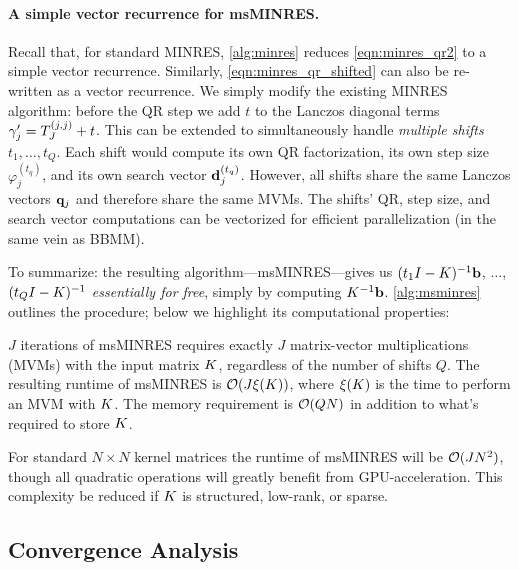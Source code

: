 

\paragraph{A simple vector recurrence for msMINRES.}
Recall that, for standard MINRES, \cref{alg:minres} reduces \cref{eqn:minres_qr2} to a simple vector recurrence.
Similarly, \cref{eqn:minres_qr_shifted} can also be re-written as a vector recurrence.
We simply modify the existing MINRES algorithm: before the QR step we add $t$ to the Lanczos diagonal terms $\gamma_j' = T_J^{(j,j)} + t$.
This can be extended to simultaneously handle \emph{multiple shifts} $t_1, \ldots, t_Q$.
Each shift would compute its own QR factorization, its own step size $\varphi_j^{(t_q)}$, and its own search vector $\mathbf{d}_j^{(t_q)}$.
However, all shifts share the same Lanczos vectors $\mathbf{q}_j$ and therefore share the same MVMs.
The shifts' QR, step size, and search vector computations can be vectorized for efficient parallelization (in the same vein as BBMM).

To summarize: the resulting algorithm---msMINRES---gives us $(t_1 I - K)^{-1} \mathbf{b}$, $\ldots$, $(t_Q I - K)^{-1}$ \emph{essentially for free}, simply by computing $K^{-1} \mathbf{b}$.
\cref{alg:msminres} outlines the procedure; below we highlight its computational properties:
%
\begin{property}
  $J$ iterations of msMINRES requires exactly $J$ matrix-vector multiplications (MVMs) with the input matrix $K$,
  regardless of the number of shifts $Q$.
  The resulting runtime of msMINRES is $\bigo{ J \mvm{\bK}}$, where $\xi ( K )$ is the time to perform an MVM with $K$.
  The memory requirement is $\bigo{ QN }$ in addition to what's required to store $K$.
\end{property}
%
\noindent
For standard $N \! \times \! N$ kernel matrices the runtime of msMINRES will be $\bigo{J N^2}$, though all quadratic operations will greatly benefit from GPU-acceleration.
This complexity be reduced if $K$ is structured, low-rank, or sparse.




\subsection{Convergence Analysis}
\label{sec:convergence}

